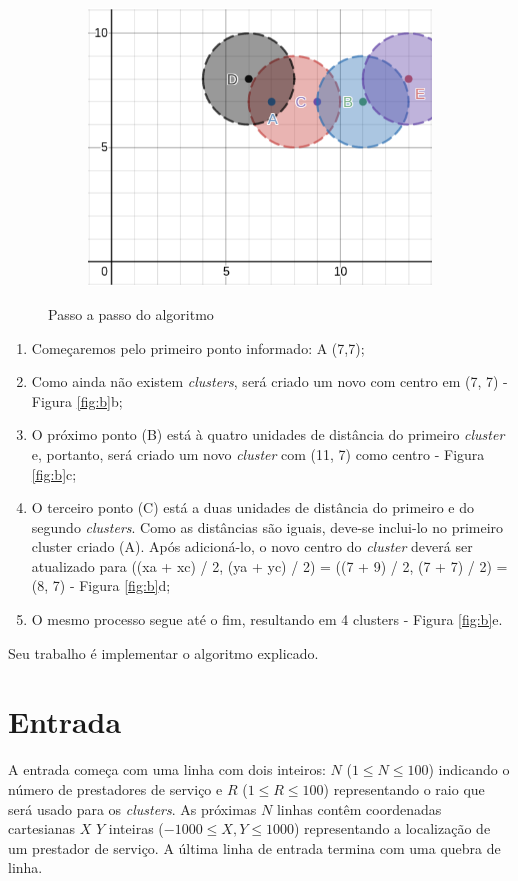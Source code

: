 \begin{figure}
     \begin{subfigure}[]{}
        \includegraphics[width=.45\textwidth]{agrupamentos/agrupamentos_5.png}
        \label{fig:e}
    \end{subfigure}\hfill

    \caption{Passo a passo do algoritmo}
\end{figure}

\begin{enumerate}
    \item Começaremos pelo primeiro ponto informado: A (7,7);
    \item Como ainda não existem \textit{clusters}, será criado um novo com centro em (7, 7) - Figura \ref{fig:b}b;
    \item O próximo ponto (B) está à quatro unidades de distância do primeiro \textit{cluster} e, portanto, será criado um novo \textit{cluster} com (11, 7) como centro - Figura \ref{fig:b}c;
    \item O terceiro ponto (C) está a duas unidades de distância do primeiro e do segundo \textit{clusters}. Como as distâncias são iguais, deve-se inclui-lo no primeiro cluster criado (A). Após adicioná-lo, o novo centro do \textit{cluster} deverá ser atualizado para ((xa + xc) / 2, (ya + yc) / 2) = ((7 + 9) / 2, (7 + 7) / 2) = (8, 7) - Figura \ref{fig:b}d;
    \item O mesmo processo segue até o fim, resultando em 4 clusters - Figura \ref{fig:b}e.
\end{enumerate}

Seu trabalho é implementar o algoritmo explicado.

\section*{Entrada}

A entrada começa com uma linha com dois inteiros: $N$ ($1 \leqslant N \leqslant 100$) indicando o número de prestadores de serviço e $R$ ($1 \leqslant R \leqslant 100$) representando o raio que será usado para os \textit{clusters}. As próximas $N$ linhas contêm coordenadas cartesianas $X$ $Y$ inteiras ($-1000 \leqslant X, Y \leqslant 1000$) representando a localização de um prestador de serviço. A última linha de entrada termina com uma quebra de linha.

